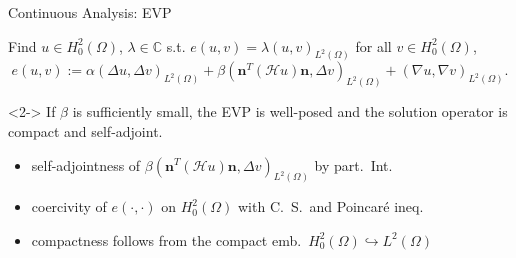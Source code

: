 \documentclass[11pt,aspectratio=169,xcolor=dvipsnames]{beamer}
\begin{document}
\begin{frame}{Continuous Analysis: EVP}
  \begin{minipage}{0.83\textwidth}
    Find $u \in H^2_0(\Omega)$, $\lambda \in \mathbb{C}$ s.t. $e(u,v) = \lambda (u,v)_{L^2(\Omega)}$ for all $v \in H^2_0(\Omega)$,
    \begin{equation*}
      e(u,v) := \alpha (\Delta u, \Delta v)_{L^2(\Omega)} + \beta (\bm{n}^T (\mathcal{H} u) \bm{n}, \Delta v)_{L^2(\Omega)} + (\nabla u, \nabla v)_{L^2(\Omega)}.
    \end{equation*}
    \begin{lemma}<2->
      If $\beta$ is sufficiently small, the EVP is \alert<4->{well-posed} and the solution operator is \alert<5->{compact} and \alert<3->{self-adjoint}.
    \end{lemma}
    \begin{itemize}
      \item<3->[\MVRightArrow] self-adjointness of $\beta (\bm{n}^T (\mathcal{H} u) \bm{n}, \Delta v)_{L^2(\Omega)}$ by part.~Int.
      \item<4->[\MVRightArrow] coercivity of $e(\cdot,\cdot)$ on $H^2_0(\Omega)$ with C.~S.~and Poincar\'e ineq.
      \item<5->[\MVRightArrow] compactness follows from the compact emb.~$H^2_0(\Omega) \hookrightarrow L^2(\Omega)$
    \end{itemize}
  \end{minipage}
  \hfill
  \begin{minipage}{0.12\textwidth}
    \centering
  \end{minipage}
\end{frame}
\end{document}
